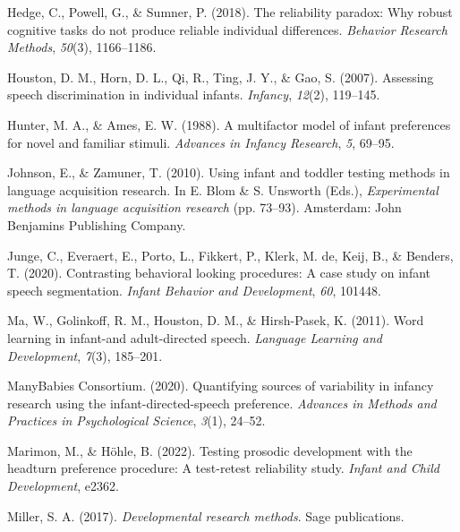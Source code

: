 \documentclass[
  man,floatsintext]{apa6}
\newlength{\cslhangindent}
\newlength{\cslentryspacingunit} %
\newenvironment{CSLReferences}[2] %
 {%
  \setlength{\parindent}{0pt}
  \ifodd #1
  \let\oldpar\par
  \def\par{\hangindent=\cslhangindent\oldpar}
  \fi
  \setlength{\parskip}{#2\cslentryspacingunit}
 }%
 {}
\begin{document}
\begin{CSLReferences}{1}{0}
\leavevmode{}%
Hedge, C., Powell, G., \& Sumner, P. (2018). The reliability paradox: Why robust cognitive tasks do not produce reliable individual differences. \emph{Behavior Research Methods}, \emph{50}(3), 1166--1186.

\leavevmode{}%
Houston, D. M., Horn, D. L., Qi, R., Ting, J. Y., \& Gao, S. (2007). Assessing speech discrimination in individual infants. \emph{Infancy}, \emph{12}(2), 119--145.

\leavevmode{}%
Hunter, M. A., \& Ames, E. W. (1988). A multifactor model of infant preferences for novel and familiar stimuli. \emph{Advances in Infancy Research}, \emph{5}, 69--95.

\leavevmode{}%
Johnson, E., \& Zamuner, T. (2010). Using infant and toddler testing methods in language acquisition research. In E. Blom \& S. Unsworth (Eds.), \emph{Experimental methods in language acquisition research} (pp. 73--93). Amsterdam: John Benjamins Publishing Company.

\leavevmode{}%
Junge, C., Everaert, E., Porto, L., Fikkert, P., Klerk, M. de, Keij, B., \& Benders, T. (2020). Contrasting behavioral looking procedures: A case study on infant speech segmentation. \emph{Infant Behavior and Development}, \emph{60}, 101448.

\leavevmode{}%
Ma, W., Golinkoff, R. M., Houston, D. M., \& Hirsh-Pasek, K. (2011). Word learning in infant-and adult-directed speech. \emph{Language Learning and Development}, \emph{7}(3), 185--201.

\leavevmode{}%
ManyBabies Consortium. (2020). Quantifying sources of variability in infancy research using the infant-directed-speech preference. \emph{Advances in Methods and Practices in Psychological Science}, \emph{3}(1), 24--52.

\leavevmode{}%
Marimon, M., \& Höhle, B. (2022). Testing prosodic development with the headturn preference procedure: A test-retest reliability study. \emph{Infant and Child Development}, e2362.

\leavevmode{}%
Miller, S. A. (2017). \emph{Developmental research methods}. Sage publications.


\end{CSLReferences}
\end{document}
